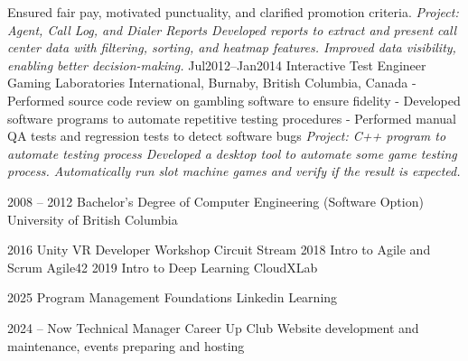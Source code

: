 \documentclass[9pt]{developercv} %
\begin{document}
\begin{entrylist}
{{            Ensured fair pay, motivated punctuality, and clarified promotion criteria.
            \newline\newline}
            \textit{Project: Agent, Call Log, and Dialer Reports\newline
            Developed reports to extract and present call center data with filtering, sorting, and heatmap features. 
            Improved data visibility, enabling better decision-making.\newline}
        }
    \entry
		{Jul2012--Jan2014}
		{Interactive Test Engineer}
		{Gaming Laboratories International, Burnaby, British Columbia, Canada}
		{
            - Performed source code review on gambling software to ensure fidelity\newline
            - Developed software programs to automate repetitive testing procedures\newline
            - Performed manual QA tests and regression tests to detect software bugs\newline\newline
            \textit{Project: C++ program to automate testing process\newline
            Developed a desktop tool to automate some game testing process. 
            Automatically run slot machine games and verify if the result is expected.\newline}
        }
\end{entrylist}



\begin{entrylist}
	\entry
		{2008 -- 2012}
		{Bachelor's Degree of Computer Engineering (Software Option)}
		{University of British Columbia}
		{}
\end{entrylist}


\begin{entrylist}
  \entry
    {2016}
    {Unity VR Developer Workshop}
    {Circuit Stream}
    {}
  \entry
    {2018}
    {Intro to Agile and Scrum}
    {Agile42}
    {}
  \entry
    {2019}
    {Intro to Deep Learning}
    {CloudXLab}
    {}
\end{entrylist}
\begin{entrylist}
	\entry
		{2025}
		{Program Management Foundations}
		{Linkedin Learning}
		{}
\end{entrylist}


\begin{entrylist}
	\entry
		{2024 -- Now}
		{Technical Manager}
		{Career Up Club}
		{Website development and maintenance, events preparing and hosting}
\end{entrylist}
\end{document}
